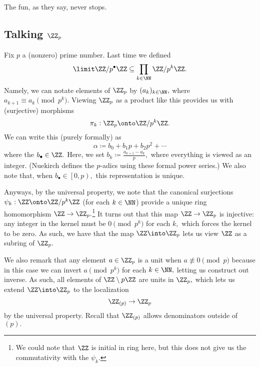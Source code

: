 \documentclass[../notes.tex]{subfiles}
\begin{document}
















The fun, as they say, never stops.

\subsection{Talking \texorpdfstring{$\ZZ_p$}{}}
Fix $p$ a (nonzero) prime number. Last time we defined
\[\limit\ZZ/p^\bullet\ZZ\subseteq\prod_{k\in\NN}\ZZ/p^k\ZZ.\]
Namely, we can notate elements of $\ZZ_p$ by $(a_k)_{k\in\NN},$ where $a_{k+1}\equiv a_k\pmod{p^k}.$ Viewing $\ZZ_p$ as a product like this provides us with (surjective) morphisms
\[\pi_k:\ZZ_p\onto\ZZ/p^k\ZZ.\]
We can write this (purely formally) as
\[\alpha\coloneqq b_0+b_1p+b_2p^2+\cdots\]
where the $b_\bullet\in\ZZ.$ Here, we set $b_k\coloneqq \frac{a_{k+1}-a_k}p,$ where everything is viewed as an integer. (Nuekirch defines the $p$-adics using these formal power series.) We also note that, when $b_\bullet\in\left[0,p\right),$ this representation is unique.

Anyways, by the universal property, we note that the canonical surjections $\psi_k:\ZZ\onto\ZZ/p^k\ZZ$ (for each $k\in\NN$) provide a unique ring homomorphism $\ZZ\to\ZZ_p.$\footnote{We could note that $\ZZ$ is initial in ring here, but this does not give us the commutativity with the $\psi_k.$} It turns out that this map $\ZZ\to\ZZ_p$ is injective: any integer in the kernel must be $0\pmod{p^k}$ for each $k,$ which forces the kernel to be zero. As such, we have that the map $\ZZ\into\ZZ_p$ lets us view $\ZZ$ as a subring of $\ZZ_p.$

We also remark that any element $a\in\ZZ_p$ is a unit when $a\not\equiv0\pmod p$ because in this case we can invert $a\pmod{p^k}$ for each $k\in\NN,$ letting us construct out inverse. As such, all elements of $\ZZ\setminus p\ZZ$ are units in $\ZZ_p,$ which lets us extend $\ZZ\into\ZZ_p$ to the localization
\[\ZZ_{(p)}\to\ZZ_p\]
by the universal property. Recall that $\ZZ_{(p)}$ allows denominators outside of $(p).$
\end{document}
